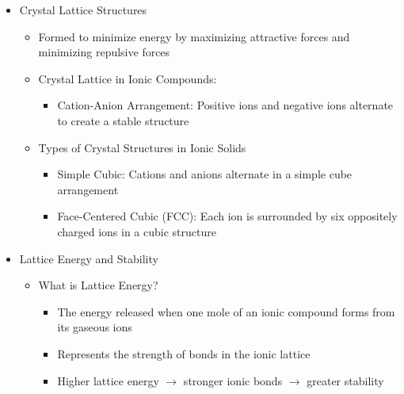 \begin{itemize}
  \item Crystal Lattice Structures

    \begin{itemize}

      \item Formed to minimize energy by maximizing attractive forces and minimizing repulsive forces

      \item Crystal Lattice in Ionic Compounds:

        \begin{itemize}

          \item Cation-Anion Arrangement: Positive ions and negative ions alternate to create a stable structure

        \end{itemize}

      \item Types of Crystal Structures in Ionic Solids

        \begin{itemize}

          \item Simple Cubic: Cations and anions alternate in a simple cube arrangement

          \item Face-Centered Cubic (FCC): Each ion is surrounded by six oppositely charged ions in a cubic structure

        \end{itemize}

    \end{itemize}

  \item Lattice Energy and Stability

    \begin{itemize}

      \item What is Lattice Energy?

        \begin{itemize}

          \item The energy released when one mole of an ionic compound forms from its gaseous ions

          \item Represents the strength of bonds in the ionic lattice

          \item Higher lattice energy $\to$ stronger ionic bonds $\to$ greater stability


\end{itemize}
\end{itemize}
\end{itemize}
